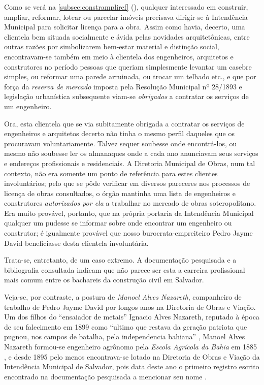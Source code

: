 Como se verá na \autoref{subsec:constrampliref} (\pageref{subsec:constrampliref}), qualquer interessado em construir, ampliar, reformar, lotear ou parcelar imóveis precisava dirigir-se à Intendência Municipal para solicitar licença para a obra. Assim como havia, decerto, uma clientela bem situada socialmente e ávida pelas novidades arquitetônicas, entre outras razões por simbolizarem bem-estar material e distinção social, encontravam-se também em meio à clientela dos engenheiros, arquitetos e construtores no período pessoas que queriam simplesmente levantar um casebre simples, ou reformar uma parede arruinada, ou trocar um telhado etc., e que por força da \textit{reserva de mercado} imposta pela Resolução Municipal nº 28/1893 e legislação urbanística subsequente viam-se \textit{obrigados} a contratar os serviços de um engenheiro.

Ora, esta clientela que se via subitamente obrigada a contratar os serviços de engenheiros e arquitetos decerto não tinha o mesmo perfil daqueles que os procuravam voluntariamente. Talvez sequer soubesse onde encontrá-los, ou mesmo não soubesse ler os almanaques onde a cada ano anunciavam seus serviços e endereços profissionais e residenciais. A Diretoria Municipal de Obras, num tal contexto, não era somente um ponto de referência para estes clientes involuntários; pelo que se pôde verificar em diversos pareceres nos processos de licença de obras consultados, o órgão mantinha uma lista de engenheiros e construtores \textit{autorizados por ela} a trabalhar no mercado de obras soteropolitano. Era muito provável, portanto, que na própria portaria da Intendência Municipal qualquer um pudesse se informar sobre onde encontrar um engenheiro ou construtor; é igualmente provável que nosso burocrata-empreiteiro Pedro Jayme David beneficiasse desta clientela involuntária.

Trata-se, entretanto, de um caso extremo. A documentação pesquisada e a bibliografia consultada indicam que não parece ser esta a carreira profissional mais comum entre os bachareis da construção civil em Salvador.

Veja-se, por contraste, a postura de \textit{Manoel Alves Nazareth}, companheiro de trabalho de Pedro Jayme David por longos anos na Diretoria de Obras e Viação. Um dos filhos do ``ensaiador de metais'' Ignacio Alves Nazareth, reputado à época de seu falecimento em 1899 como ``ultimo que restava da geração patriota que pugnou, nos campos de batalha, pela independencia bahiana'' \cite{apontamentos_1899}, Manoel Alves Nazareth formou-se engenheiro agrônomo pela \textit{Escola Agrícola da Bahia} em 1885 \cite[p.~141]{araujo_agronomia_2010}, e desde 1895 pelo menos encontrava-se lotado na Diretoria de Obras e Viação da Intendência Municipal de Salvador, pois data deste ano o primeiro registro escrito encontrado na documentação pesquisada a mencionar seu nome \cite{salvador_relatorio_1895}. 

